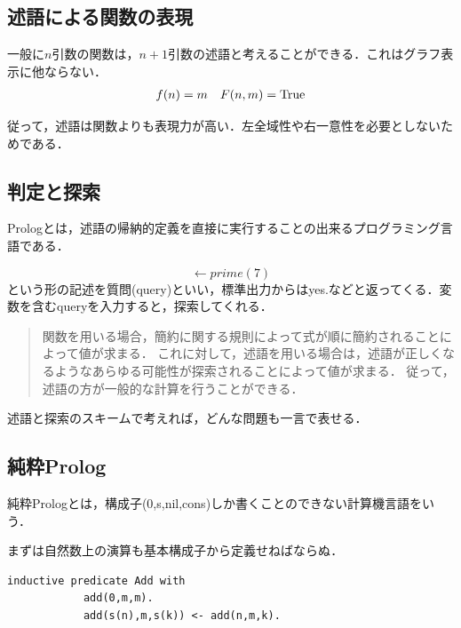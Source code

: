 \documentclass[uplatex, dvipdfmx]{jsreport}
\begin{document}
\subsection{述語による関数の表現}

一般に$n$引数の関数は，$n+1$引数の述語と考えることができる．これはグラフ表示に他ならない．
\begin{align*}
    f(n) &= m & F(n,m)=\mathrm{True}
\end{align*}

従って，述語は関数よりも表現力が高い．左全域性や右一意性を必要としないためである．

\subsection{判定と探索}

Prologとは，述語の帰納的定義を直接に実行することの出来るプログラミング言語である．
\begin{definition}[query]
    \[\leftarrow prime(7)\]
    という形の記述を質問(query)といい，標準出力からはyes.などと返ってくる．変数を含むqueryを入力すると，探索してくれる．
\end{definition}

\begin{quotation}
    関数を用いる場合，簡約に関する規則によって式が順に簡約されることによって値が求まる．
    これに対して，述語を用いる場合は，述語が正しくなるようなあらゆる可能性が探索されることによって値が求まる．
    従って，述語の方が一般的な計算を行うことができる\cite{関数プログラミング}．
\end{quotation}

述語と探索のスキームで考えれば，どんな問題も一言で表せる．

\subsection{純粋Prolog}

純粋Prologとは，構成子(0,s,nil,cons)しか書くことのできない計算機言語をいう．

\begin{example}[Add]まずは自然数上の演算も基本構成子から定義せねばならぬ．
    \begin{lstlisting}[caption=natural number summation]
        inductive predicate Add with
            add(0,m,m).
            add(s(n),m,s(k)) <- add(n,m,k).
    \end{lstlisting}
\end{example}
\end{document}
